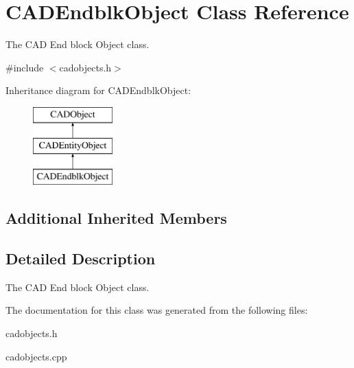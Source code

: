 \hypertarget{class_c_a_d_endblk_object}{}\section{C\+A\+D\+Endblk\+Object Class Reference}
\label{class_c_a_d_endblk_object}


The C\+AD End block Object class.  




{\ttfamily \#include $<$cadobjects.\+h$>$}

Inheritance diagram for C\+A\+D\+Endblk\+Object\+:\begin{figure}[H]
\begin{center}
\leavevmode
\includegraphics[height=3.000000cm]{class_c_a_d_endblk_object}
\end{center}
\end{figure}
\subsection*{Additional Inherited Members}


\subsection{Detailed Description}
The C\+AD End block Object class. 

The documentation for this class was generated from the following files\+:\begin{DoxyCompactItemize}
\item 
cadobjects.\+h\item 
cadobjects.\+cpp\end{DoxyCompactItemize}
